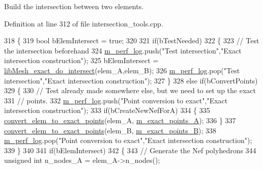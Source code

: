 Build the intersection between two elements. 



Definition at line 312 of file intersection\+\_\+tools.\+cpp.


\begin{DoxyCode}
318 \{
319     \textcolor{keywordtype}{bool} bElemIntersect = \textcolor{keyword}{true};
320 
321     \textcolor{keywordflow}{if}(bTestNeeded)
322     \{
323         \textcolor{comment}{// Test the intersection beforehand}
324         \hyperlink{classcarl_1_1_intersection___tools_afe18e6ca5fd12bae08efb98f69c71a48}{m\_perf\_log}.push(\textcolor{stringliteral}{"Test intersection"},\textcolor{stringliteral}{"Exact intersection construction"});
325         bElemIntersect = \hyperlink{classcarl_1_1_intersection___tools_ae7b16748a45a0579bafecb48ef2fc4ce}{libMesh\_exact\_do\_intersect}(elem\_A,elem\_B);
326         \hyperlink{classcarl_1_1_intersection___tools_afe18e6ca5fd12bae08efb98f69c71a48}{m\_perf\_log}.pop(\textcolor{stringliteral}{"Test intersection"},\textcolor{stringliteral}{"Exact intersection construction"});
327     \}
328     \textcolor{keywordflow}{else} \textcolor{keywordflow}{if}(bConvertPoints)
329     \{
330         \textcolor{comment}{// Test already made somewhere else, but we need to set up the exact}
331         \textcolor{comment}{// points.}
332         \hyperlink{classcarl_1_1_intersection___tools_afe18e6ca5fd12bae08efb98f69c71a48}{m\_perf\_log}.push(\textcolor{stringliteral}{"Point conversion to exact"},\textcolor{stringliteral}{"Exact intersection construction"});
333         \textcolor{keywordflow}{if}(bCreateNewNefForA)
334         \{
335             \hyperlink{classcarl_1_1_intersection___tools_a1d6303ff6ffc19b6df42626e29a507ce}{convert\_elem\_to\_exact\_points}(elem\_A,
      \hyperlink{classcarl_1_1_intersection___tools_ad636117b292272044b252be62124eb0a}{m\_exact\_points\_A});
336         \}
337         \hyperlink{classcarl_1_1_intersection___tools_a1d6303ff6ffc19b6df42626e29a507ce}{convert\_elem\_to\_exact\_points}(elem\_B,
      \hyperlink{classcarl_1_1_intersection___tools_a2c3b6211dd1f9b0aa5f2ac8ffc383182}{m\_exact\_points\_B});
338         \hyperlink{classcarl_1_1_intersection___tools_afe18e6ca5fd12bae08efb98f69c71a48}{m\_perf\_log}.pop(\textcolor{stringliteral}{"Point conversion to exact"},\textcolor{stringliteral}{"Exact intersection construction"});
339     \}
340 
341     \textcolor{keywordflow}{if}(bElemIntersect)
342     \{
343         \textcolor{comment}{// Generate the Nef polyhedrons}
344         \textcolor{keywordtype}{unsigned} \textcolor{keywordtype}{int} n\_nodes\_A = elem\_A->n\_nodes();

\end{DoxyCode}
